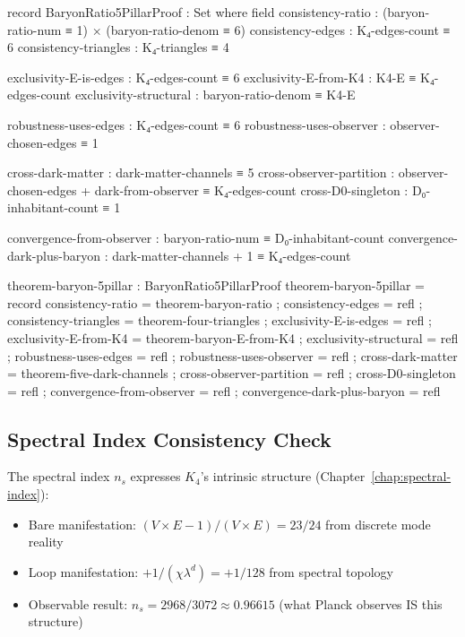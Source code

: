 \documentclass[11pt,a4paper]{book}
\begin{document}
\begin{code}
record BaryonRatio5PillarProof : Set where
  field
    consistency-ratio : (baryon-ratio-num ≡ 1) × (baryon-ratio-denom ≡ 6)
    consistency-edges : K₄-edges-count ≡ 6
    consistency-triangles : K₄-triangles ≡ 4
    
    exclusivity-E-is-edges : K₄-edges-count ≡ 6
    exclusivity-E-from-K4 : K4-E ≡ K₄-edges-count
    exclusivity-structural : baryon-ratio-denom ≡ K4-E
    
    robustness-uses-edges : K₄-edges-count ≡ 6
    robustness-uses-observer : observer-chosen-edges ≡ 1
    
    cross-dark-matter : dark-matter-channels ≡ 5
    cross-observer-partition : observer-chosen-edges + dark-from-observer ≡ K₄-edges-count
    cross-D0-singleton : D₀-inhabitant-count ≡ 1
    
    convergence-from-observer : baryon-ratio-num ≡ D₀-inhabitant-count
    convergence-dark-plus-baryon : dark-matter-channels + 1 ≡ K₄-edges-count

theorem-baryon-5pillar : BaryonRatio5PillarProof
theorem-baryon-5pillar = record
  { consistency-ratio = theorem-baryon-ratio
  ; consistency-edges = refl
  ; consistency-triangles = theorem-four-triangles
  ; exclusivity-E-is-edges = refl
  ; exclusivity-E-from-K4 = theorem-baryon-E-from-K4
  ; exclusivity-structural = refl
  ; robustness-uses-edges = refl
  ; robustness-uses-observer = refl
  ; cross-dark-matter = theorem-five-dark-channels
  ; cross-observer-partition = refl
  ; cross-D0-singleton = refl
  ; convergence-from-observer = refl
  ; convergence-dark-plus-baryon = refl
  }
\end{code}

\subsection{Spectral Index Consistency Check}

The spectral index $n_s$ expresses $K_4$'s intrinsic structure (Chapter~\ref{chap:spectral-index}):
\begin{itemize}
  \item Bare manifestation: $(V \times E - 1)/(V \times E) = 23/24$ from discrete mode reality
  \item Loop manifestation: $+1/(\chi \lambda^d) = +1/128$ from spectral topology
  \item Observable result: $n_s = 2968/3072 \approx 0.96615$ (what Planck observes IS this structure)
\end{itemize}
\end{document}
